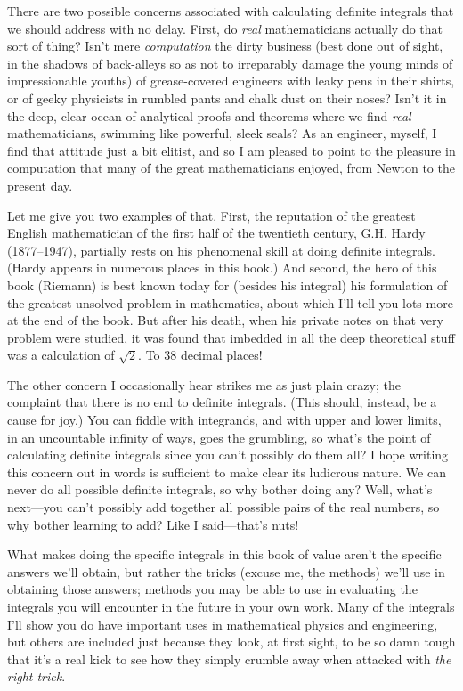 There are two possible concerns associated with calculating definite integrals
that we should address with no delay. First, do \textit{real} mathematicians actually do that
sort of thing? Isn’t mere \textit{computation }the dirty business (best done out of sight, in
the shadows of back-alleys so as not to irreparably damage the young minds of
impressionable youths) of grease-covered engineers with leaky pens in their shirts,
or of geeky physicists in rumbled pants and chalk dust on their noses? Isn’t it in the
deep, clear ocean of analytical proofs and theorems where we find \textit{real}
mathematicians, swimming like powerful, sleek seals? As an engineer, myself, I find that
attitude just a bit elitist, and so I am pleased to point to the pleasure in computation
that many of the great mathematicians enjoyed, from Newton to the present day.

Let me give you two examples of that. First, the reputation of the greatest
English mathematician of the first half of the twentieth century, G.H. Hardy
(1877–1947), partially rests on his phenomenal skill at doing definite integrals.
(Hardy appears in numerous places in this book.) And second, the hero of this book
(Riemann) is best known today for (besides his integral) his formulation of the
greatest unsolved problem in mathematics, about which I’ll tell you lots more at the
end of the book. But after his death, when his private notes on that very problem
were studied, it was found that imbedded in all the deep theoretical stuff was a
calculation of $ \sqrt{2} $. To 38 decimal places!

The other concern I occasionally hear strikes me as just plain crazy; the
complaint that there is no end to definite integrals. (This should, instead, be a
cause for joy.) You can fiddle with integrands, and with upper and lower limits, in
an uncountable infinity of ways, goes the grumbling, so what’s the point of
calculating definite integrals since you can’t possibly do them all? I hope writing
this concern out in words is sufficient to make clear its ludicrous nature. We can
never do all possible definite integrals, so why bother doing any? Well, what’s
next—you can’t possibly add together all possible pairs of the real numbers, so why
bother learning to add? Like I said—that’s nuts!

What makes doing the specific integrals in this book of value aren’t the specific
answers we’ll obtain, but rather the tricks (excuse me, the methods) we’ll use in
obtaining those answers; methods you may be able to use in evaluating the integrals
you will encounter in the future in your own work. Many of the integrals I’ll show
you do have important uses in mathematical physics and engineering, but others are
included just because they look, at first sight, to be so damn tough that it’s a real
kick to see how they simply crumble away when attacked with \textit{the right trick}.

